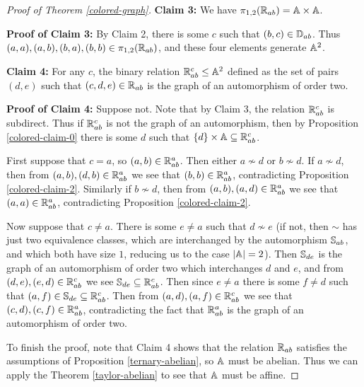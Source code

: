 \documentclass[letterpaper,11pt]{article}
\begin{document}
\begin{proof}[Proof of Theorem \ref{colored-graph}]
{\bf Claim 3:} We have $\pi_{1,2}(\mathbb{R}_{ab}) = \mathbb{A}\times \mathbb{A}$.

{\bf Proof of Claim 3:} By Claim 2, there is some $c$ such that $(b,c) \in \mathbb{D}_{ab}$. Thus $(a,a),(a,b),(b,a),(b,b) \in \pi_{1,2}(\mathbb{R}_{ab})$, and these four elements generate $\mathbb{A}^2$.

{\bf Claim 4:} For any $c$, the binary relation $\mathbb{R}_{ab}^c \le \mathbb{A}^2$ defined as the set of pairs $(d,e)$ such that $(c,d,e) \in \mathbb{R}_{ab}$ is the graph of an automorphism of order two.

{\bf Proof of Claim 4:} Suppose not. Note that by Claim 3, the relation $\mathbb{R}_{ab}^c$ is subdirect. Thus if $\mathbb{R}_{ab}^c$ is not the graph of an automorphism, then by Proposition \ref{colored-claim-0} there is some $d$ such that $\{d\}\times \mathbb{A} \subseteq \mathbb{R}_{ab}^c$.

First suppose that $c = a$, so $(a,b) \in \mathbb{R}_{ab}^a$. Then either $a \not\sim d$ or $b \not\sim d$. If $a \not\sim d$, then from $(a,b),(d,b) \in \mathbb{R}_{ab}^a$ we see that $(b,b) \in \mathbb{R}_{ab}^a$, contradicting Proposition \ref{colored-claim-2}. Similarly if $b \not\sim d$, then from $(a,b),(a,d) \in \mathbb{R}_{ab}^a$ we see that $(a,a) \in \mathbb{R}_{ab}^a$, contradicting Proposition \ref{colored-claim-2}.

Now suppose that $c \ne a$. There is some $e \ne a$ such that $d \not\sim e$ (if not, then $\sim$ has just two equivalence classes, which are interchanged by the automorphism $\mathbb{S}_{ab}$, and which both have size $1$, reducing us to the case $|\mathbb{A}| = 2$). Then $\mathbb{S}_{de}$ is the graph of an automorphism of order two which interchanges $d$ and $e$, and from $(d,e), (e,d) \in \mathbb{R}_{ab}^c$ we see $\mathbb{S}_{de} \subseteq \mathbb{R}_{ab}^c$. Then since $e \ne a$ there is some $f \ne d$ such that $(a,f) \in \mathbb{S}_{de} \subseteq \mathbb{R}_{ab}^c$. Then from $(a,d), (a,f) \in \mathbb{R}_{ab}^c$ we see that $(c,d), (c,f) \in \mathbb{R}_{ab}^a$, contradicting the fact that $\mathbb{R}_{ab}^a$ is the graph of an automorphism of order two.

To finish the proof, note that Claim 4 shows that the relation $\mathbb{R}_{ab}$ satisfies the assumptions of Proposition \ref{ternary-abelian}, so $\mathbb{A}$ must be abelian. Thus we can apply the Theorem \ref{taylor-abelian} to see that $\mathbb{A}$ must be affine.
\end{proof}
\end{document}
